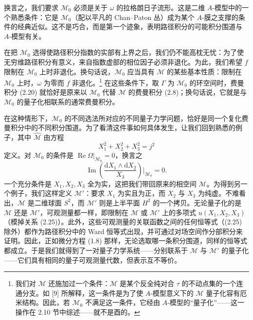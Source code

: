 \documentclass[11pt,a4paper,UTF8]{ctexart}
\theoremstyle{plain}
\theoremstyle{definition}
\begin{document}
换言之，我们要求 $\mathcal M_0$ 必须是关于 $\omega$ 的拉格朗日子流形。这是二维 $A$-模型中的一个熟悉条件：它是 $\mathcal M_0$（配以平凡的 Chan--Paton 丛）成为某个 $A$-膜之支撑的条件的经典近似。这不是巧合，而是第一个迹象，表明路径积分的可能积分围道与 $A$-模型有关。

在把 $\mathcal M_0$ 选得使路径积分指数的实部有上界之后，我们仍不能高枕无忧：为了使无穷维路径积分有意义，来自指数虚部的相位因子必须非退化。为此，我们希望 $f$ 限制在 $\mathcal M_0$ 上时非退化。换句话说，$\mathcal M_0$ 应当具有 $\mathcal M$ 的某些基本性质：限制在 $\mathcal M_0$ 上时，$\omega$ 为零而 $f$ 非退化。\footnote[6]{我们对 $\mathcal M$ 还施加过一个条件：$\mathcal M$ 是某个反全纯对合 $\tau$ 的不动点集的一个连通分支。如 [9] 所解释，这一条件是为了使 $A$-模型意义下的 $\mathcal M$ 量子化容有厄米结构。因此，若 $\mathcal M_0$ 不满足这一条件，它经由 $A$-模型的“量子化”——这一操作在 2.10 节中综述——就不是酉的。} 在这些条件下，取 $\Gamma$ 为 $\mathcal M_0$ 的环空间时，费曼积分 (2.20) 就恰好是原来以 $\mathcal M_0$ 代替 $\mathcal M$ 的费曼积分 (2.8)；换句话说，它就是与 $\mathcal M_0$ 的量子化相联系的通常费曼积分。

在这种情形下，$\mathcal M_0$ 的不同选法所对应的不同量子力学问题，恰好是同一个复化费曼积分中的不同积分围道。为了看清这件事如何具体发生，让我们回到熟悉的例子，其中 $\widehat{\mathcal M}$ 由方程
\begin{equation}
    X_1^2+X_2^2+X_3^2=j^2
    \tag{2.25}
\end{equation}
定义。对 $\mathcal M_0$ 的条件是 $\operatorname{Re}\Omega|_{\mathcal M_0}=0$，换言之
\begin{equation}
    \operatorname{Im}\left(\frac{\mathrm{d}X_1\wedge\mathrm{d}X_2}{X_3}\right)\bigg|_{\mathcal M_0}=0 .
    \tag{2.26}
\end{equation}
一个充分条件是 $X_1,X_2,X_3$ 全为实，这把我们带回原来的相空间 $\mathcal M$。为得到另一个例子，我们这样定义 $\mathcal M'$：要求 $X_1$ 为实且为正，而 $X_2$ 与 $X_3$ 为纯虚。不难看出，$\mathcal M$ 是二维球面 $S^2$，而 $\mathcal M'$ 则是上半平面 $H^2$ 的一个拷贝。无论量子化的是 $\mathcal M$ 还是 $\mathcal M'$，可观测量都一样，即限制在 $\mathcal M$ 或 $\mathcal M'$ 上的多项式 $u(X_1,X_2,X_3)$（模掉关系 (2.25)）。此外，这些可观测量的关联函数之间的任何恒等式（(2.25) 除外）都作为路径积分中的 Ward 恒等式出现，并可通过对场空间作分部积分来证明。因此，正如微分方程 (1.8) 那样，无论选取哪一条积分围道，同样的恒等式都成立。于是我们就得到了一对量子力学系统——分别联系于 $\mathcal M$ 与 $\mathcal M'$ 的量子化——它们具有相同的量子可观测量代数，但表示互不等价。
\end{document}
